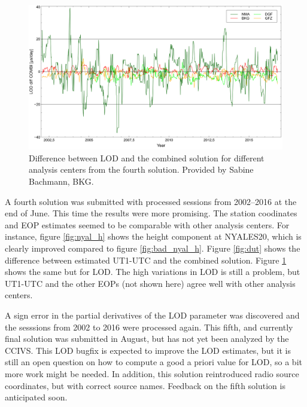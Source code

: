 \documentclass[twocolumn,twoside]{svmultivs_gm} %
\begin{document}
\begin{figure}[!htbp]
\includegraphics[width=\linewidth]{kirkvik05}
\caption{Difference between LOD and the combined solution for different analysis centers from the fourth solution.
Provided by Sabine Bachmann, BKG.}
\label{fig:lod}
\end{figure}


A fourth solution was submitted with processed sessions from 2002--2016 at the end of June. This time the results were
more promising.
The station coodinates and EOP estimates seemed to be comparable with other analysis centers. For instance, figure
\ref{fig:nyal_h} shows the height component at NYALES20, which is clearly improved compared to figure
\ref{fig:bad_nyal_h}.
Figure \ref{fig:dut} shows the difference between estimated UT1-UTC and the combined solution. Figure \ref{fig:lod} shows the same but for LOD. The high variations in LOD is still a problem, but UT1-UTC and the
other EOPs (not shown here) agree well with other analysis centers.

A sign error in the partial derivatives of the LOD parameter was discovered and the sesssions from 2002 to 2016 were
processed again. This fifth, and currently final solution was submitted in August, but has not yet been analyzed by the
CCIVS. This LOD bugfix is expected to improve the LOD estimates, but it is still an open question on
how to compute a good a priori value for LOD, so a bit more work might be needed. In addition, this solution
reintroduced radio source coordinates, but with correct source names. Feedback on the fifth
solution is anticipated soon.


% 
 
\end{document}
